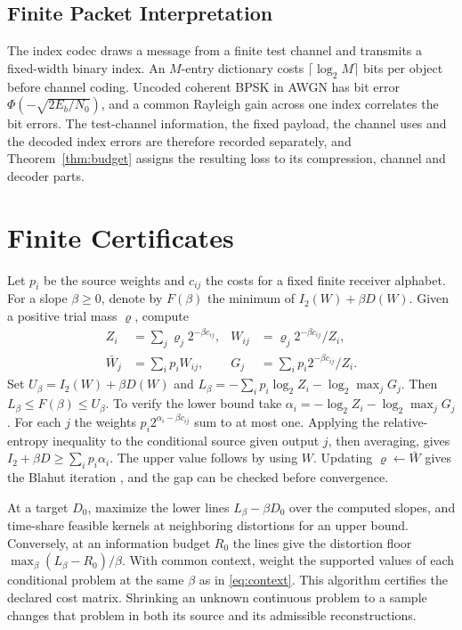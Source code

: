 \documentclass[10pt,journal]{IEEEtran}
\begin{document}
\subsection{Finite Packet Interpretation}
The index codec draws a message from a finite test channel and transmits a fixed-width binary index. An $M$-entry dictionary costs $\lceil\log_2M\rceil$ bits per object before channel coding. Uncoded coherent BPSK in AWGN has bit error $\Phi(-\sqrt{2E_b/N_0})$, and a common Rayleigh gain across one index correlates the bit errors. The test-channel information, the fixed payload, the channel uses and the decoded index errors are therefore recorded separately, and Theorem~\ref{thm:budget} assigns the resulting loss to its compression, channel and decoder parts.

\section{Finite Certificates}\label{sec:ba}
Let $p_i$ be the source weights and $c_{ij}$ the costs for a fixed finite receiver alphabet. For a slope $\beta\ge0$, denote by $F(\beta)$ the minimum of $I_2(W)+\beta D(W)$. Given a positive trial mass $\varrho$, compute
\begin{align}
 Z_i&=\sum_j \varrho_j2^{-\beta c_{ij}},&
 W_{ij}&=\varrho_j2^{-\beta c_{ij}}/Z_i,\nonumber\\
 \bar W_j&=\sum_i p_iW_{ij},&
 G_j&=\sum_i p_i2^{-\beta c_{ij}}/Z_i .
\end{align}
Set $U_\beta=I_2(W)+\beta D(W)$ and $L_\beta=-\sum_i p_i\log_2 Z_i-\log_2\max_j G_j$. Then $L_\beta\le F(\beta)\le U_\beta$. To verify the lower bound take $\alpha_i=-\log_2 Z_i-\log_2\max_j G_j$. For each $j$ the weights $p_i2^{\alpha_i-\beta c_{ij}}$ sum to at most one. Applying the relative-entropy inequality to the conditional source given output $j$, then averaging, gives $I_2+\beta D\ge\sum_i p_i\alpha_i$. The upper value follows by using $W$. Updating $\varrho\gets\bar W$ gives the Blahut iteration \cite{blahut1972computation}, and the gap can be checked before convergence.

At a target $D_0$, maximize the lower lines $L_\beta-\beta D_0$ over the computed slopes, and time-share feasible kernels at neighboring distortions for an upper bound. Conversely, at an information budget $R_0$ the lines give the distortion floor $\max_\beta(L_\beta-R_0)/\beta$. With common context, weight the supported values of each conditional problem at the same $\beta$ as in \eqref{eq:context}. This algorithm certifies the declared cost matrix. Shrinking an unknown continuous problem to a sample changes that problem in both its source and its admissible reconstructions.
\end{document}
